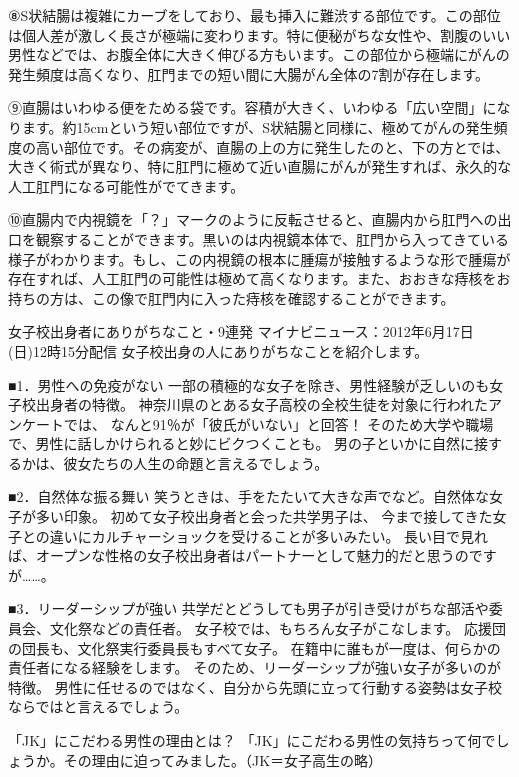 ⑧S状結腸は複雑にカーブをしており、最も挿入に難渋する部位です。この部位は個人差が激しく長さが極端に変わります。特に便秘がちな女性や、割腹のいい男性などでは、お腹全体に大きく伸びる方もいます。この部位から極端にがんの発生頻度は高くなり、肛門までの短い間に大腸がん全体の7割が存在します。

⑨直腸はいわゆる便をためる袋です。容積が大きく、いわゆる「広い空間」になります。約15cmという短い部位ですが、S状結腸と同様に、極めてがんの発生頻度の高い部位です。その病変が、直腸の上の方に発生したのと、下の方とでは、大きく術式が異なり、特に肛門に極めて近い直腸にがんが発生すれば、永久的な人工肛門になる可能性がでてきます。

⑩直腸内で内視鏡を「？」マークのように反転させると、直腸内から肛門への出口を観察することができます。黒いのは内視鏡本体で、肛門から入ってきている様子がわかります。もし、この内視鏡の根本に腫瘍が接触するような形で腫瘍が存在すれば、人工肛門の可能性は極めて高くなります。また、おおきな痔核をお持ちの方は、この像で肛門内に入った痔核を確認することができます。



女子校出身者にありがちなこと・9連発
マイナビニュース：2012年6月17日(日)12時15分配信
女子校出身の人にありがちなことを紹介します。

■1．男性への免疫がない
一部の積極的な女子を除き、男性経験が乏しいのも女子校出身者の特徴。
神奈川県のとある女子高校の全校生徒を対象に行われたアンケートでは、
なんと91％が「彼氏がいない」と回答！
そのため大学や職場で、男性に話しかけられると妙にビクつくことも。
男の子といかに自然に接するかは、彼女たちの人生の命題と言えるでしょう。

■2．自然体な振る舞い
笑うときは、手をたたいて大きな声でなど。自然体な女子が多い印象。
初めて女子校出身者と会った共学男子は、
今まで接してきた女子との違いにカルチャーショックを受けることが多いみたい。
長い目で見れば、オープンな性格の女子校出身者はパートナーとして魅力的だと思うのですが……。

■3．リーダーシップが強い
共学だとどうしても男子が引き受けがちな部活や委員会、文化祭などの責任者。
女子校では、もちろん女子がこなします。
応援団の団長も、文化祭実行委員長もすべて女子。
在籍中に誰もが一度は、何らかの責任者になる経験をします。
そのため、リーダーシップが強い女子が多いのが特徴。
男性に任せるのではなく、自分から先頭に立って行動する姿勢は女子校ならではと言えるでしょう。



「JK」にこだわる男性の理由とは？
「JK」にこだわる男性の気持ちって何でしょうか。その理由に迫ってみました。（JK＝女子高生の略）

